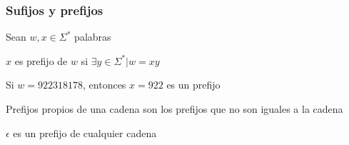 \begin{frame}
  \frametitle{Sufijos y prefijos}
        Sean $w, x \in \Sigma^*$ palabras
      \begin{defi}
		  $x$ es prefijo de $w$ si $\exists y \in \Sigma^* | w=xy$	
			\end{defi}

			\pause
			Si $w=922318178$, entonces $x=922$ es un prefijo

			\pause
      \begin{defi}
		  Prefijos propios de una cadena son los prefijos que no son iguales a la cadena
			\end{defi}

			\pause
			$\epsilon$ es un prefijo de cualquier cadena

\end{frame}
